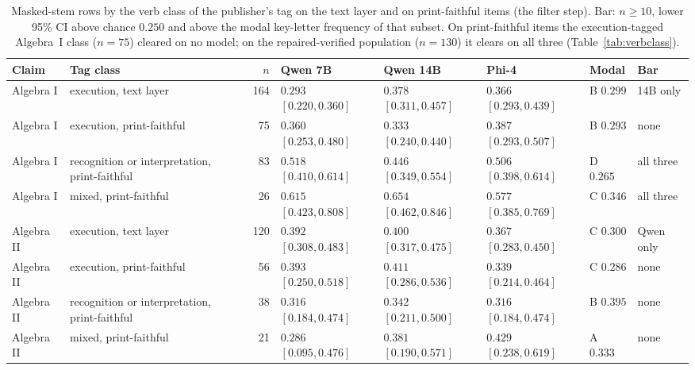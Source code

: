\begin{table}[t]
  \caption{Masked-stem rows by the verb class of the publisher's tag on the text layer and on print-faithful items (the filter step). Bar: $n\ge 10$, lower 95\% CI above chance $0.250$ and above the modal key-letter frequency of that subset. On print-faithful items the execution-tagged Algebra~I class ($n=75$) cleared on no model; on the repaired-verified population ($n=130$) it clears on all three (Table~\ref{tab:verbclass}).}
  \label{tab:verbclass-text}
  \centering
  \scriptsize
  \begin{tabular}{l l r l l l l l}
    \toprule
    Claim & Tag class & $n$ & Qwen 7B & Qwen 14B & Phi-4 & Modal & Bar \\
    \midrule
    Algebra I & execution, text layer & 164 & $0.293$ $[0.220, 0.360]$ & $0.378$ $[0.311, 0.457]$ & $0.366$ $[0.293, 0.439]$ & B $0.299$ & 14B only \\
    Algebra I & execution, print-faithful & 75 & $0.360$ $[0.253, 0.480]$ & $0.333$ $[0.240, 0.440]$ & $0.387$ $[0.293, 0.507]$ & B $0.293$ & none \\
    Algebra I & recognition or interpretation, print-faithful & 83 & $0.518$ $[0.410, 0.614]$ & $0.446$ $[0.349, 0.554]$ & $0.506$ $[0.398, 0.614]$ & D $0.265$ & all three \\
    Algebra I & mixed, print-faithful & 26 & $0.615$ $[0.423, 0.808]$ & $0.654$ $[0.462, 0.846]$ & $0.577$ $[0.385, 0.769]$ & C $0.346$ & all three \\
    Algebra II & execution, text layer & 120 & $0.392$ $[0.308, 0.483]$ & $0.400$ $[0.317, 0.475]$ & $0.367$ $[0.283, 0.450]$ & C $0.300$ & Qwen only \\
    Algebra II & execution, print-faithful & 56 & $0.393$ $[0.250, 0.518]$ & $0.411$ $[0.286, 0.536]$ & $0.339$ $[0.214, 0.464]$ & C $0.286$ & none \\
    Algebra II & recognition or interpretation, print-faithful & 38 & $0.316$ $[0.184, 0.474]$ & $0.342$ $[0.211, 0.500]$ & $0.316$ $[0.184, 0.474]$ & B $0.395$ & none \\
    Algebra II & mixed, print-faithful & 21 & $0.286$ $[0.095, 0.476]$ & $0.381$ $[0.190, 0.571]$ & $0.429$ $[0.238, 0.619]$ & A $0.333$ & none \\
    \bottomrule
  \end{tabular}
\end{table}

